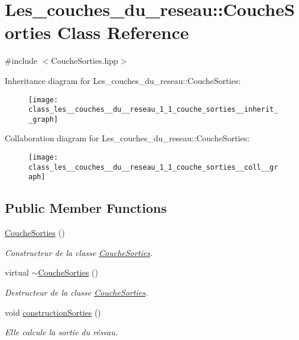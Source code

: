 \hypertarget{class_les__couches__du__reseau_1_1_couche_sorties}{}\section{Les\+\_\+couches\+\_\+du\+\_\+reseau\+:\+:Couche\+Sorties Class Reference}
\label{class_les__couches__du__reseau_1_1_couche_sorties}


{\ttfamily \#include $<$Couche\+Sorties.\+hpp$>$}



Inheritance diagram for Les\+\_\+couches\+\_\+du\+\_\+reseau\+:\+:Couche\+Sorties\+:\nopagebreak
\begin{figure}[H]
\begin{center}
\leavevmode
\texttt{[image: class\_les\_\_couches\_\_du\_\_reseau\_1\_1\_couche\_sorties\_\_inherit\_\_graph]}
\end{center}
\end{figure}


Collaboration diagram for Les\+\_\+couches\+\_\+du\+\_\+reseau\+:\+:Couche\+Sorties\+:\nopagebreak
\begin{figure}[H]
\begin{center}
\leavevmode
\texttt{[image: class\_les\_\_couches\_\_du\_\_reseau\_1\_1\_couche\_sorties\_\_coll\_\_graph]}
\end{center}
\end{figure}
\subsection*{Public Member Functions}
\begin{DoxyCompactItemize}
\item 
\hyperlink{class_les__couches__du__reseau_1_1_couche_sorties_a24c107da84b3406fedfe0071750a054b}{Couche\+Sorties} ()
\begin{DoxyCompactList}\small\item\em Constructeur de la classe \hyperlink{class_les__couches__du__reseau_1_1_couche_sorties}{Couche\+Sorties}. \end{DoxyCompactList}\item 
virtual \hyperlink{class_les__couches__du__reseau_1_1_couche_sorties_a0f1a57f483686a6d14582f40aef38299}{$\sim$\+Couche\+Sorties} ()
\begin{DoxyCompactList}\small\item\em Destructeur de la classe \hyperlink{class_les__couches__du__reseau_1_1_couche_sorties}{Couche\+Sorties}. \end{DoxyCompactList}\item 
void \hyperlink{class_les__couches__du__reseau_1_1_couche_sorties_a5d206488b6fed1e3e8ca6b06ae04688d}{construction\+Sorties} ()
\begin{DoxyCompactList}\small\item\em Elle calcule la sortie du réseau. \end{DoxyCompactList}\end{DoxyCompactItemize}


